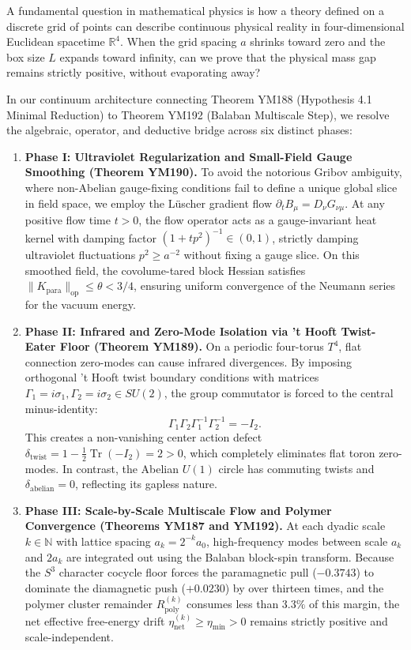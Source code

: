 \documentclass[11pt,a4paper]{article}
\theoremstyle{definition}
\begin{document}
A fundamental question in mathematical physics is how a theory defined on a discrete grid of points can describe continuous physical reality in four-dimensional Euclidean spacetime $\mathbb{R}^4$. When the grid spacing $a$ shrinks toward zero and the box size $L$ expands toward infinity, can we prove that the physical mass gap remains strictly positive, without evaporating away?

In our continuum architecture connecting Theorem YM188 (Hypothesis 4.1 Minimal Reduction) to Theorem YM192 (Balaban Multiscale Step), we resolve the algebraic, operator, and deductive bridge across six distinct phases:

\begin{enumerate}
  \item \textbf{Phase I: Ultraviolet Regularization and Small-Field Gauge Smoothing (Theorem YM190).}
  To avoid the notorious Gribov ambiguity, where non-Abelian gauge-fixing conditions fail to define a unique global slice in field space, we employ the L\"uscher gradient flow $\partial_t B_\mu = D_\nu G_{\nu\mu}$. At any positive flow time $t > 0$, the flow operator acts as a gauge-invariant heat kernel with damping factor $(1 + t p^2)^{-1} \in (0, 1)$, strictly damping ultraviolet fluctuations $p^2 \ge a^{-2}$ without fixing a gauge slice. On this smoothed field, the covolume-tared block Hessian satisfies $\|K_{\mathrm{para}}\|_{\mathrm{op}} \le \theta < 3/4$, ensuring uniform convergence of the Neumann series for the vacuum energy.
  
  \item \textbf{Phase II: Infrared and Zero-Mode Isolation via 't Hooft Twist-Eater Floor (Theorem YM189).}
  On a periodic four-torus $T^4$, flat connection zero-modes can cause infrared divergences. By imposing orthogonal 't Hooft twist boundary conditions with matrices $\Gamma_1 = i \sigma_1, \Gamma_2 = i \sigma_2 \in SU(2)$, the group commutator is forced to the central minus-identity:
  \begin{equation}
  \Gamma_1 \Gamma_2 \Gamma_1^{-1} \Gamma_2^{-1} = -I_2.
  \end{equation}
  This creates a non-vanishing center action defect $\delta_{\mathrm{twist}} = 1 - \frac{1}{2} \operatorname{Tr}(-I_2) = 2 > 0$, which completely eliminates flat toron zero-modes. In contrast, the Abelian $U(1)$ circle has commuting twists and $\delta_{\mathrm{abelian}} = 0$, reflecting its gapless nature.
  
  \item \textbf{Phase III: Scale-by-Scale Multiscale Flow and Polymer Convergence (Theorems YM187 and YM192).}
  At each dyadic scale $k \in \mathbb{N}$ with lattice spacing $a_k = 2^{-k} a_0$, high-frequency modes between scale $a_k$ and $2 a_k$ are integrated out using the Balaban block-spin transform. Because the $S^3$ character cocycle floor forces the paramagnetic pull ($-0.3743$) to dominate the diamagnetic push ($+0.0230$) by over thirteen times, and the polymer cluster remainder $R_{\mathrm{poly}}^{(k)}$ consumes less than $3.3\%$ of this margin, the net effective free-energy drift $\eta_{\mathrm{net}}^{(k)} \ge \eta_{\min} > 0$ remains strictly positive and scale-independent.
  

\end{enumerate}
\end{document}
